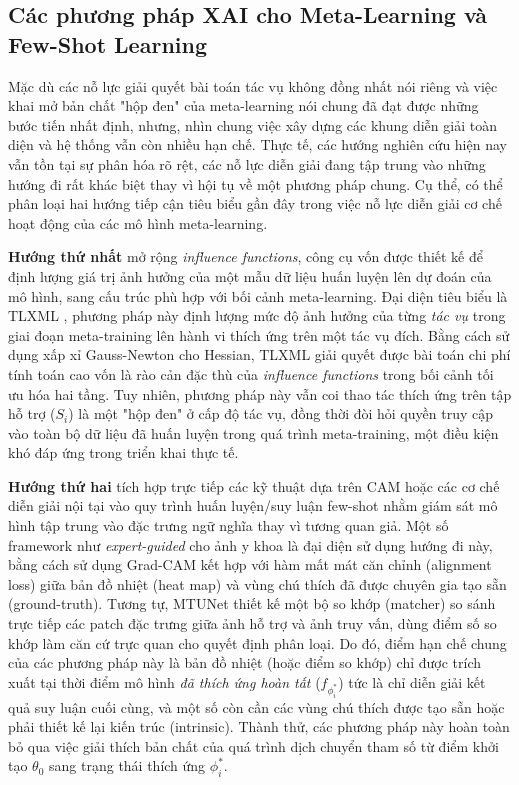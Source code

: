 \subsection{Các phương pháp XAI cho Meta-Learning và Few-Shot Learning}
\label{subsec:xai_metalearning}

Mặc dù các nỗ lực giải quyết bài toán tác vụ không đồng nhất nói riêng và việc khai mở bản chất "hộp đen" của meta-learning nói chung đã đạt được những bước tiến nhất định, nhưng, nhìn chung việc xây dựng các khung diễn giải toàn diện và hệ thống vẫn còn nhiều hạn chế. Thực tế, các hướng nghiên cứu hiện nay vẫn tồn tại sự phân hóa rõ rệt, các nỗ lực diễn giải đang tập trung vào những hướng đi rất khác biệt thay vì hội tụ về một phương pháp chung. Cụ thể, có thể phân loại hai hướng tiếp cận tiêu biểu gần đây trong việc nỗ lực diễn giải cơ chế hoạt động của các mô hình meta-learning.

\textbf{Hướng thứ nhất} mở rộng \textit{influence functions}, công cụ vốn được thiết kế để định lượng giá trị ảnh hưởng của một mẫu dữ liệu huấn luyện lên dự đoán của mô hình, sang cấu trúc phù hợp với bối cảnh meta-learning. Đại diện tiêu biểu là TLXML \cite{mitsuka2025tlxml}, phương pháp này định lượng mức độ ảnh hưởng của từng \textit{tác vụ} trong giai đoạn meta-training lên hành vi thích ứng trên một tác vụ đích. Bằng cách sử dụng xấp xỉ Gauss-Newton cho Hessian, TLXML giải quyết được bài toán chi phí tính toán cao vốn là rào cản đặc thù của \textit{influence functions} trong bối cảnh tối ưu hóa hai tầng. Tuy nhiên, phương pháp này vẫn coi thao tác thích ứng trên tập hỗ trợ ($S_i$) là một "hộp đen" ở cấp độ tác vụ, đồng thời đòi hỏi quyền truy cập vào toàn bộ dữ liệu đã huấn luyện trong quá trình meta-training, một điều kiện khó đáp ứng trong triển khai thực tế.

\textbf{Hướng thứ hai} tích hợp trực tiếp các kỹ thuật dựa trên CAM hoặc các cơ chế diễn giải nội tại vào quy trình huấn luyện/suy luận few-shot nhằm giám sát mô hình tập trung vào đặc trưng ngữ nghĩa thay vì tương quan giả. Một số framework như \textit{expert-guided} cho ảnh y khoa \cite{uddin2025expert} là đại diện sử dụng hướng đi này, bằng cách sử dụng Grad-CAM kết hợp với hàm mất mát căn chỉnh (alignment loss) giữa bản đồ nhiệt (heat map) và vùng chú thích đã được chuyên gia tạo sẵn (ground-truth). Tương tự, MTUNet \cite{wang2021mtunet} thiết kế một bộ so khớp (matcher) so sánh trực tiếp các patch đặc trưng giữa ảnh hỗ trợ và ảnh truy vấn, dùng điểm số so khớp làm căn cứ trực quan cho quyết định phân loại. Do đó, điểm hạn chế chung của các phương pháp này là bản đồ nhiệt (hoặc điểm so khớp) chỉ được trích xuất tại thời điểm mô hình \textit{đã thích ứng hoàn tất} ($f_{\phi_i^*}$) tức là chỉ diễn giải kết quả suy luận cuối cùng, và một số còn cần các vùng chú thích được tạo sẵn hoặc phải thiết kế lại kiến trúc (intrinsic). Thành thử, các phương pháp này hoàn toàn bỏ qua việc giải thích bản chất của quá trình dịch chuyển tham số từ điểm khởi tạo $\theta_0$ sang trạng thái thích ứng $\phi_i^*$.

